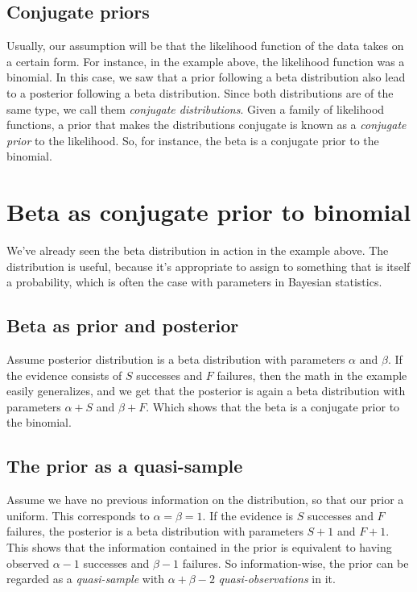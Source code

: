 \documentclass[12pt, a4paper]{article}
\begin{document}
\subsection{Conjugate priors}
Usually, our assumption will be that the likelihood function of the data takes on a certain form. For instance, in the example above, the likelihood function was a binomial. In this case, we saw that a prior following a beta distribution also lead to a posterior following a beta distribution. Since both distributions are of the same type, we call them \textit{conjugate distributions}. Given a family of likelihood functions, a prior that makes the distributions conjugate is known as a \textit{conjugate prior} to the likelihood. So, for instance, the beta is a conjugate prior to the binomial.

\section{Beta as conjugate prior to binomial}
We've already seen the beta distribution in action in the example above. The distribution is useful, because it's appropriate to assign to something that is itself a probability, which is often the case with parameters in Bayesian statistics.

\subsection{Beta as prior and posterior}
Assume posterior distribution is a beta distribution with parameters $\alpha$ and $\beta$. If the evidence consists of $S$ successes and $F$ failures, then the math in the example easily generalizes, and we get that the posterior is again a beta distribution with parameters $\alpha+S$ and $\beta+F$. Which shows that the beta is a conjugate prior to the binomial.

\subsection{The prior as a quasi-sample}
Assume we have no previous information on the distribution, so that our prior a uniform. This corresponds to $\alpha=\beta=1$. If the evidence is $S$ successes and $F$ failures, the posterior is a beta distribution with parameters $S+1$ and $F+1$. This shows that the information contained in the prior is equivalent to having observed $\alpha-1$ successes and $\beta-1$ failures. So information-wise, the prior can be regarded as a \textit{quasi-sample} with $\alpha+\beta-2$ \textit{quasi-observations} in it.
\end{document}
